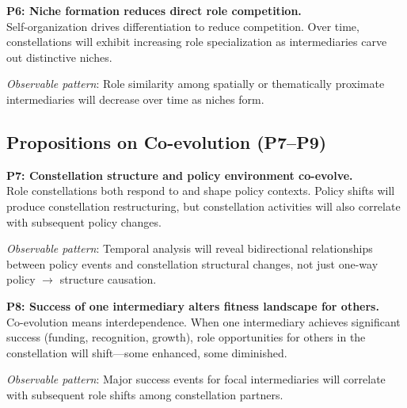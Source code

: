 \documentclass[../main.tex]{subfiles}
\begin{document}
\begin{propositionbox}
\textbf{P6: Niche formation reduces direct role competition.}\\[3pt]
Self-organization drives differentiation to reduce competition. Over time, constellations will exhibit increasing role specialization as intermediaries carve out distinctive niches.

\vspace{4pt}
\textit{Observable pattern}: Role similarity among spatially or thematically proximate intermediaries will decrease over time as niches form.
\end{propositionbox}

\subsection{Propositions on Co-evolution (P7--P9)}

\begin{propositionbox}
\textbf{P7: Constellation structure and policy environment co-evolve.}\\[3pt]
Role constellations both respond to and shape policy contexts. Policy shifts will produce constellation restructuring, but constellation activities will also correlate with subsequent policy changes.

\vspace{4pt}
\textit{Observable pattern}: Temporal analysis will reveal bidirectional relationships between policy events and constellation structural changes, not just one-way policy $\rightarrow$ structure causation.
\end{propositionbox}

\begin{propositionbox}
\textbf{P8: Success of one intermediary alters fitness landscape for others.}\\[3pt]
Co-evolution means interdependence. When one intermediary achieves significant success (funding, recognition, growth), role opportunities for others in the constellation will shift---some enhanced, some diminished.

\vspace{4pt}
\textit{Observable pattern}: Major success events for focal intermediaries will correlate with subsequent role shifts among constellation partners.
\end{propositionbox}
\end{document}

